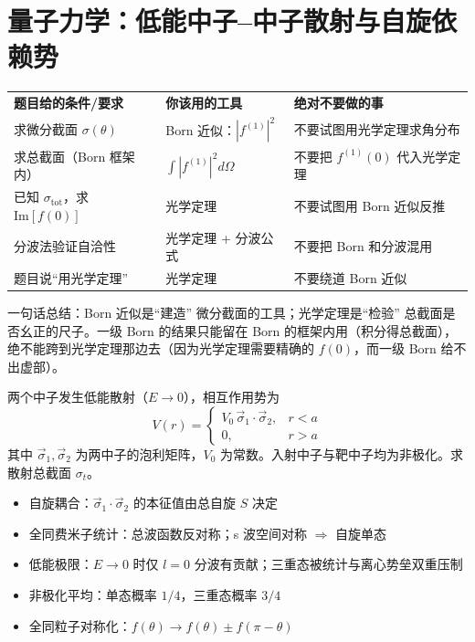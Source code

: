 
\section{量子力学：低能中子--中子散射与自旋依赖势}
\label{sec:nn-scattering}

\begin{cheatbox}[考场速查卡]
\begin{tabular}{lll}
\textbf{题目给的条件/要求} & \textbf{你该用的工具} & \textbf{绝对不要做的事} \\
求微分截面 $\sigma(\theta)$ & Born 近似：$|f^{(1)}|^2$ & 不要试图用光学定理求角分布 \\
求总截面（Born 框架内） & $\int |f^{(1)}|^2 d\Omega$ & 不要把 $f^{(1)}(0)$ 代入光学定理 \\
已知 $\sigma_{\text{tot}}$，求 $\text{Im}[f(0)]$ & 光学定理 & 不要试图用 Born 近似反推 \\
分波法验证自洽性 & 光学定理 + 分波公式 & 不要把 Born 和分波混用 \\
题目说``用光学定理'' & 光学定理 & 不要绕道 Born 近似 \\
\end{tabular}

一句话总结：Born 近似是``建造'' 微分截面的工具；光学定理是``检验'' 总截面是否幺正的尺子。一级 Born 的结果只能留在 Born 的框架内用（积分得总截面），绝不能跨到光学定理那边去（因为光学定理需要精确的 $f(0)$，而一级 Born 给不出虚部）。
\end{cheatbox}

\begin{modelbox}
两个中子发生低能散射（$E \to 0$），相互作用势为
\[
V(r) = \begin{cases}
V_0 \, \vec{\sigma}_1 \cdot \vec{\sigma}_2, & r < a \\[4pt]
0, & r > a
\end{cases}
\]
其中 $\vec{\sigma}_1, \vec{\sigma}_2$ 为两中子的泡利矩阵，$V_0$ 为常数。入射中子与靶中子均为非极化。求散射总截面 $\sigma_t$。
\end{modelbox}

\begin{tipbox}[考点快速分析]
\begin{itemize}
    \item 自旋耦合：$\vec{\sigma}_1 \cdot \vec{\sigma}_2$ 的本征值由总自旋 $S$ 决定
    \item 全同费米子统计：总波函数反对称；s 波空间对称 $\Rightarrow$ 自旋单态
    \item 低能极限：$E \to 0$ 时仅 $l = 0$ 分波有贡献；三重态被统计与离心势垒双重压制
    \item 非极化平均：单态概率 $1/4$，三重态概率 $3/4$
    \item 全同粒子对称化：$f(\theta) \to f(\theta) \pm f(\pi - \theta)$
\end{itemize}
\end{tipbox}

